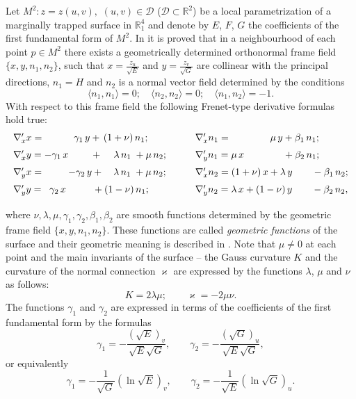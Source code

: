\documentclass[12pt]{amsart}
\newcommand{\R}{\mathbb R}
\theoremstyle{definition}
\theoremstyle{remark}
\newcommand{\ds}{\displaystyle}
\numberwithin{equation}{section}
\begin{document}
Let $M^2: z = z(u,v), \, \, (u,v) \in {\mathcal D}$ (${\mathcal D} \subset \R^2$) be a local parametrization of a marginally trapped surface in $\R^4_1$ and denote by $E$, $F$, $G$ the coefficients of the 
first fundamental form of $M^2$.
In \cite{G-M-JMP-2012} it is proved that in a neighbourhood of each point $p \in M^2$ there exists a geometrically determined orthonormal frame field $\{x,y,n_1,n_2\}$, such that 
$x = \ds{\frac{z_u}{\sqrt{E}}}$  and $y = \ds{\frac{z_v}{\sqrt{G}}}$ are collinear with the principal directions, $n_1 = H$ and $n_2$ is a normal vector field determined by the conditions
$$\langle n_1, n_1 \rangle = 0; \quad \langle n_2, n_2 \rangle = 0; \quad \langle n_1, n_2 \rangle = -1.$$
With respect to this frame field  the
following Frenet-type derivative formulas  hold true:
\begin{equation} \label{Eq-5}
	\begin{array}{ll}
		\vspace{2mm} \nabla'_xx=\quad \quad \quad \gamma_1\,y+\,(1+\nu)\,n_1;
		& \qquad
		\nabla'_x n_1= \quad\quad \quad \quad  \mu\,y+\beta_1\,n_1;\\
		\vspace{2mm} \nabla'_xy=-\gamma_1\,x\quad \quad \; + \,\quad  \lambda\,n_1
		\; + \mu\,n_2;  & \qquad
		\nabla'_y n_1=\mu \,x \quad\quad \quad \quad +\beta_2\,n_1;\\
		\vspace{2mm} \nabla'_yx=\quad\quad \;\, -\gamma_2\,y  + \quad \lambda\,n_1
		\; +\mu\,n_2;  & \qquad
		\nabla'_xn_2= (1+\nu) \, x + \lambda \,y \quad \quad  -\beta_1\,n_2;\\
		\vspace{2mm} \nabla'_yy=\;\;\gamma_2\,x \quad\quad\;\;\,
		+(1-\nu)\,n_1; & \qquad \nabla'_y n_2= \lambda \, x  + (1-\nu) \,y
		\quad \quad -\beta_2\,n_2,
	\end{array}
\end{equation}
where $\nu, \lambda, \mu, \gamma_1, \gamma_2, \beta_1, \beta_2$ are smooth functions determined by the geometric frame field $\{x,y,n_1,n_2\}$. These functions are called \textit{geometric functions} of the surface and their geometric meaning is described in \cite{G-M-JMP-2012}. Note that $\mu \neq 0$ at each point and the main invariants of the surface -- the Gauss curvature $K$ and the curvature of the normal connection $\varkappa$ are expressed by the functions $\lambda$, $\mu$ and $\nu$ as follows:
\begin{equation} \label{eq:K_kappa}
K=2\lambda\mu; \qquad  \varkappa=-2\mu\nu.
\end{equation} 
The functions $\gamma_1$ and $\gamma_2$  are expressed in terms of the coefficients of the first fundamental form by the formulas
\begin{equation*} %
	\gamma_1=-\frac{(\sqrt E)_v}{\sqrt E\sqrt G},  \qquad \gamma_2=-\frac{(\sqrt G)_u}{\sqrt E\sqrt G},
\end{equation*} 
or equivalently
\begin{equation} \label{eq:gamma1}
	\gamma_1=-\frac{1}{\sqrt G} (\ln \sqrt E)_v,  \qquad \gamma_2=-\frac{1}{\sqrt E} (\ln \sqrt G)_u.
\end{equation} 
\end{document}
